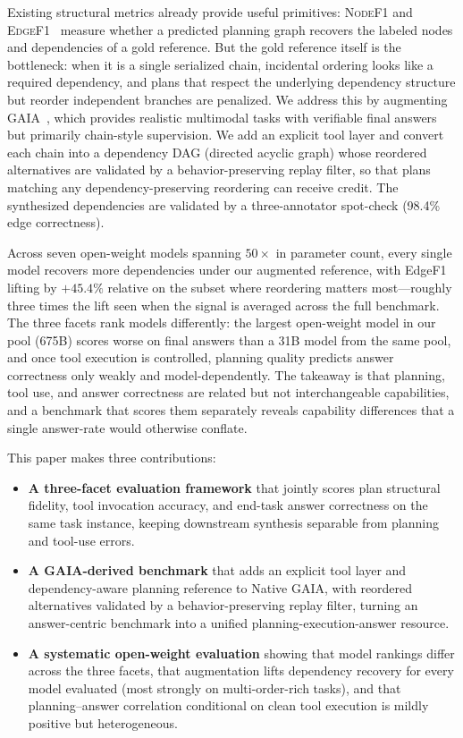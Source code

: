 \documentclass{article}
\providecommand{\metric}[1]{\textsc{#1}}
\begin{document}
Existing structural metrics already provide useful primitives:  \metric{NodeF1} and \metric{EdgeF1}~\cite{shen2024taskbench,gabriel2024advancing} measure whether a predicted planning graph recovers the labeled nodes and dependencies of a gold reference.
But the gold reference itself is the bottleneck: when it is a single serialized chain, incidental ordering looks like a required dependency, and plans that respect the underlying dependency structure but reorder independent branches are penalized. 
We address this by augmenting GAIA~\cite{mialon2023gaia}, which provides realistic multimodal tasks with verifiable final answers but primarily chain-style supervision. We add an explicit tool layer and convert each chain into a dependency DAG (directed acyclic graph) whose reordered alternatives are validated by a behavior-preserving replay filter, so that plans matching any dependency-preserving reordering can receive credit.
The synthesized dependencies are validated by a three-annotator spot-check (98.4\% edge correctness).


Across seven open-weight models spanning $50\times$ in parameter count, every single model recovers more dependencies under our augmented reference, with EdgeF1 lifting by $+45.4\%$ relative on the subset where reordering matters most---roughly three times the lift seen when the signal is averaged across the full benchmark. 
The three facets rank models differently: the largest open-weight model in our pool (675B) scores worse on final answers than a 31B model from the same pool, and once tool execution is controlled, planning quality predicts answer correctness only weakly and model-dependently. The takeaway is that planning, tool use, and answer correctness are related but not interchangeable capabilities, and a benchmark that scores them separately reveals capability differences that a single answer-rate would otherwise conflate.


This paper makes three contributions:
\begin{itemize}[noitemsep, topsep=2pt, leftmargin=*]
    \item \textbf{A three-facet evaluation framework} that jointly scores plan structural fidelity, tool invocation accuracy, and end-task answer correctness on the same task instance, keeping downstream synthesis separable from planning and tool-use errors.
    \item \textbf{A GAIA-derived benchmark} that adds an explicit tool layer and dependency-aware planning reference to Native GAIA, with reordered alternatives validated by a behavior-preserving replay filter, turning an answer-centric benchmark into a unified planning-execution-answer resource.
    \item \textbf{A systematic open-weight evaluation} showing that model rankings differ across the three facets, that augmentation lifts dependency recovery for every model evaluated (most strongly on multi-order-rich tasks), and that planning--answer correlation conditional on clean tool execution is mildly positive but heterogeneous.
\end{itemize}
\end{document}
